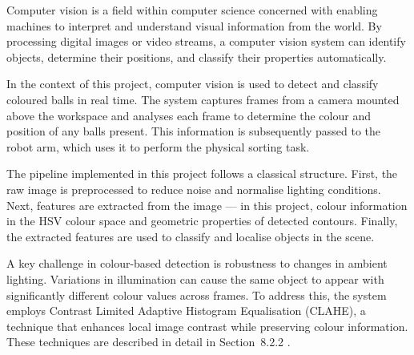 
Computer vision is a field within computer science concerned with enabling machines to interpret and understand visual information from the world. By processing digital images or video streams, a computer vision system can identify objects, determine their positions, and classify their properties automatically.

In the context of this project, computer vision is used to detect and classify coloured balls in real time. The system captures frames from a camera mounted above the workspace and analyses each frame to determine the colour and position of any balls present. This information is subsequently passed to the robot arm, which uses it to perform the physical sorting task.

The pipeline implemented in this project follows a classical structure. First, the raw image is preprocessed to reduce noise and normalise lighting conditions. Next, features are extracted from the image — in this project, colour information in the HSV colour space and geometric properties of detected contours. Finally, the extracted features are used to classify and localise objects in the scene.

A key challenge in colour-based detection is robustness to changes in ambient lighting. Variations in illumination can cause the same object to appear with significantly different colour values across frames. To address this, the system employs Contrast Limited Adaptive Histogram
Equalisation (CLAHE), a technique that enhances local image contrast while
preserving colour information. These techniques are described in detail in
Section~8.2.2 \cite{bradski2008learning}.
